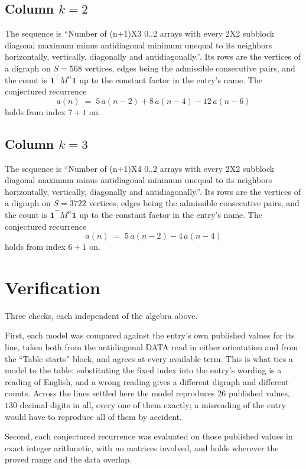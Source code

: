 \documentclass[11pt,a4paper]{article}
\theoremstyle{plain}
\theoremstyle{definition}
\begin{document}
\subsection*{Column $k$$=2$}
The sequence is ``Number of (n+1)X3 0..2 arrays with every 2X2 subblock diagonal maximum minus antidiagonal minimum unequal to its neighbors horizontally, vertically, diagonally and antidiagonally.''. Its rows are the vertices of a digraph on
$S=568$ vertices, edges being the admissible consecutive pairs, and the count is
$\mathbf{1}^{\!\top}M^{n}\mathbf{1}$ up to the constant factor in the entry's name.
The conjectured recurrence
\[
a(n)\;=\;5\,a(n-2) + 8\,a(n-4) - 12\,a(n-6)
\]
holds from index $7+1$ on.

\subsection*{Column $k$$=3$}
The sequence is ``Number of (n+1)X4 0..2 arrays with every 2X2 subblock diagonal maximum minus antidiagonal minimum unequal to its neighbors horizontally, vertically, diagonally and antidiagonally.''. Its rows are the vertices of a digraph on
$S=3722$ vertices, edges being the admissible consecutive pairs, and the count is
$\mathbf{1}^{\!\top}M^{n}\mathbf{1}$ up to the constant factor in the entry's name.
The conjectured recurrence
\[
a(n)\;=\;5\,a(n-2) - 4\,a(n-4)
\]
holds from index $6+1$ on.

\section{Verification}

Three checks, each independent of the algebra above.

First, each model was compared against the entry's own published values for its line, taken
both from the antidiagonal DATA read in either orientation and from the ``Table starts''
block, and agrees at every available term. This is what ties a model to the table:
substituting the fixed index into the entry's wording is a reading of English, and a wrong
reading gives a different digraph and different counts. Across the lines settled here the
model reproduces $26$ published values, $130$ decimal digits in all, every one of
them exactly; a misreading of the entry would have to reproduce all of them by accident.

Second, each conjectured recurrence was evaluated on those published values in exact
integer arithmetic, with no matrices involved, and holds wherever the proved range and the
data overlap.
\end{document}
